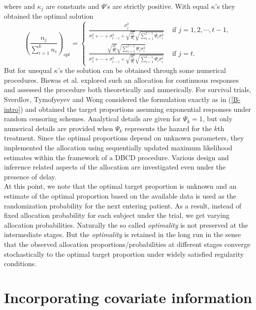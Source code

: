 where and $\kappa_{j}$ are constants and $\Psi$'s are strictly positive. With equal $\kappa$'s they obtained the optimal solution
\[\left(\frac{n_{j}}{\sum_{i=1}^{k}n_{i}}\right)_{opt} = \left\{
\begin{array}{ll}
\frac{\sigma_{j}^{2}}{\sigma_{1}^{2}+\cdots +\sigma_{t-1}^{2}+\sqrt{\frac{\sigma_{t}^{2}}{\Psi_{t}}}\sqrt{\sum_{i=1}^{t-1}\Psi_{i}\sigma_{i}^{2}}}& \mbox{~if~} j=1,2,\cdots ,t-1,\\
\frac{\sqrt{\frac{\sigma_{t}^{2}}{\Psi_{t}}}\sqrt{\sum_{i=1}^{t-1}\Psi_{i}\sigma_{i}^{2}}}{\sigma_{1}^{2}+\cdots +\sigma_{t-1}^{2}+\sqrt{\frac{\sigma_{t}^{2}}{\Psi_{t}}}\sqrt{\sum_{i=1}^{t-1}\Psi_{i}\sigma_{i}^{2}}} & \mbox{~if~} j=t.
\end{array}
\right. \]
But for unequal $\kappa$'s  the solution can be obtained through some numerical procedures. Biswas et al.\cite{52}  explored such an allocation for continuous responses and assessed the procedure both theoretically and numerically. For survival trials, Sverdlov, Tymofyeyev and Wong\cite{53} considered the formulation exactly as in (\ref{B-intro}) and obtained the target proportions assuming exponential responses under random censoring schemes. Analytical details are given for $\Psi_{k}=1$, but only numerical details are provided when $\Psi_{k}$ represents the hazard for the $k$th treatment. Since the optimal proportions depend on unknown parameters, they implemented the allocation using sequentially updated maximum likelihood estimates within the framework of a DBCD procedure\cite{36}. Various design and inference related aspects of the allocation are investigated even under the presence of delay.\\

\noindent  At this point, we note that the optimal target proportion is unknown and  an estimate of the optimal proportion based on the available data is used as the randomization probability for the next entering patient. As a result, instead of fixed allocation probability for each subject under the trial, we get varying allocation probabilities. Naturally the so called \textit{optimality} is not preserved at the intermediate stages. But the \textit{optimality} is retained in the long run in the sense that the observed allocation proportions/probabilities at different stages converge stochastically to the optimal target proportion under widely satisfied regularity conditions.

\section{Incorporating covariate information}

